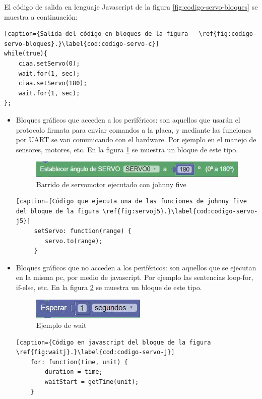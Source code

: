 El código de salida en lenguaje Javascript de la figura \ref{fig:codigo-servo-bloques} se muestra a continuación:


\begin{lstlisting}[caption={Salida del código en bloques de la figura 	\ref{fig:codigo-servo-bloques}.}\label{cod:codigo-servo-c}] 
while(true){
	ciaa.setServo(0);
	wait.for(1, sec);
	ciaa.setServo(180);
	wait.for(1, sec);
};

\end{lstlisting}


\begin{itemize}
	\item Bloques gráficos que acceden a los periféricos: son aquellos que usarán el protocolo firmata para enviar comandos a la placa, y mediante las funciones por UART se van comunicando con el hardware. Por ejemplo en el manejo de sensores, motores, etc. En la figura \ref{fig:servoj5} se muestra un bloque de este tipo.
	
	
	\begin{figure}[!htbp]
		\centering
		\includegraphics[scale=.60]{./Figures/ejemplo-servo-j5.PNG}
		\caption{Barrido de servomotor ejecutado con johnny five}
		\label{fig:servoj5}
	\end{figure}
   
    \begin{lstlisting}[caption={Código que ejecuta una de las funciones de johnny five del bloque de la figura \ref{fig:servoj5}.}\label{cod:codigo-servo-j5}] 
     setServo: function(range) {
        servo.to(range);
     }
    \end{lstlisting}
	
	\item Bloques gráficos que no acceden a los periféricos: son aquellos que se ejecutan en la misma pc, por medio de javascript. Por ejemplo las sentencias loop-for, if-else, etc.  En la figura \ref{fig:waitj} se muestra un bloque de este tipo.
	
	\begin{figure}[!htbp]
		\centering
		\includegraphics[scale=.60]{./Figures/ejemplo-servo-j.PNG}
		\caption{Ejemplo de wait}
		\label{fig:waitj}
	\end{figure}

	\begin{lstlisting}[caption={Código en javascript del bloque de la figura \ref{fig:waitj}.}\label{cod:codigo-servo-j}] 
	for: function(time, unit) {
		duration = time;
		waitStart = getTime(unit);
	}
	\end{lstlisting}
\end{itemize}

